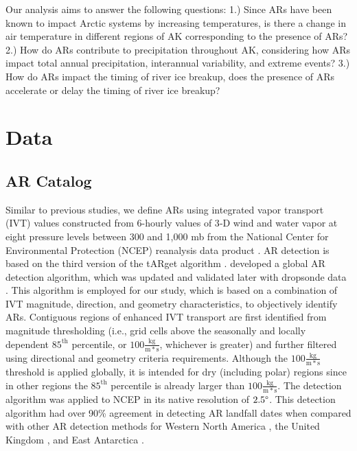 \documentclass[12pts,draft]{AR_analysis_}
\begin{document}
Our analysis aims to answer the following questions: 
1.) Since ARs have been known to impact Arctic systems by increasing 
temperatures, is there a change in
air temperature in different regions of AK corresponding to the 
presence of ARs?
2.) How do ARs contribute to precipitation throughout AK, 
considering how ARs impact total annual precipitation, interannual 
variability, and extreme events?
3.) How do ARs impact the timing of river ice breakup, does the presence 
of ARs accelerate or delay the timing of river ice breakup?

\section{Data}

\subsection{AR Catalog}

Similar to previous studies, we define ARs using integrated vapor
transport (IVT) values constructed from 6-hourly values of 3‐D wind and
water vapor at eight pressure levels between 300 and 1,000
mb from the National Center for Environmental Protection (NCEP) 
reanalysis data product \cite{NCEP_NCAR_reanalysis}. 
AR detection is based on the third version of the tARget algorithm
\cite{Guan_Waliser2019, bin2022}.
 developed a global
AR detection algorithm, which was updated and validated later with
dropsonde data \cite{guan2018}. This algorithm is employed for
our study, which is based on a combination of IVT magnitude,
direction, and geometry characteristics, to objectively identify ARs.
Contiguous regions of enhanced IVT transport are first identified from
magnitude thresholding (i.e., grid cells above the seasonally
and locally dependent $85^{\text{th}}$ percentile, or 
$\mathrm{100\frac{kg}{m*s}}$, 
whichever is greater) and further filtered
using directional and geometry criteria requirements. Although the 
$\mathrm{100\frac{kg}{m*s}}$ threshold is applied globally, it is intended for 
dry (including polar) regions since in other regions the $85^{\text{th}}$ percentile 
is already larger than $\mathrm{100\frac{kg}{m*s}}$. The detection
algorithm was applied to NCEP in its native resolution of $2.5 \degree$.
This detection algorithm had over 90\% agreement in detecting AR
landfall dates when compared with other AR detection methods for Western
North America \cite{Neiman2008}, the United Kingdom \cite{Lavers2011}, 
and East Antarctica \cite{Gorodetskaya2014}. 
\end{document}
